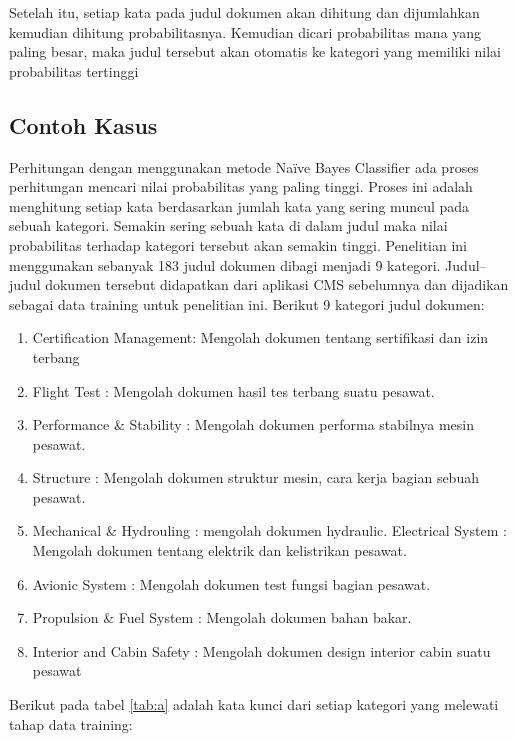 \par Setelah itu, setiap kata pada judul dokumen akan dihitung dan dijumlahkan kemudian dihitung probabilitasnya. Kemudian dicari probabilitas mana yang paling besar, maka judul tersebut akan otomatis ke kategori yang memiliki nilai probabilitas tertinggi

\subsection{Contoh Kasus}
Perhitungan dengan menggunakan metode Naïve Bayes Classifier ada proses perhitungan mencari nilai probabilitas yang paling tinggi. Proses ini adalah menghitung setiap kata berdasarkan jumlah kata yang sering muncul pada sebuah kategori. Semakin sering sebuah kata di dalam judul maka nilai probabilitas terhadap kategori tersebut akan semakin tinggi. Penelitian ini menggunakan sebanyak 183 judul dokumen dibagi menjadi 9 kategori. Judul–judul dokumen tersebut didapatkan dari aplikasi CMS sebelumnya dan dijadikan sebagai data training untuk penelitian ini. Berikut 9 kategori judul dokumen:
    \begin{enumerate}
        \item 	Certification Management: Mengolah dokumen tentang sertifikasi dan izin terbang
    	\item Flight Test : Mengolah dokumen hasil tes terbang suatu pesawat.
	    \item Performance & Stability : Mengolah dokumen performa stabilnya mesin pesawat.
	    \item Structure : Mengolah dokumen struktur mesin, cara kerja bagian sebuah pesawat.
        \item Mechanical & Hydrouling : mengolah dokumen hydraulic.
    	\ITEM Electrical System : Mengolah dokumen tentang elektrik dan kelistrikan pesawat.
	    \item Avionic System : Mengolah dokumen test fungsi bagian pesawat.
	    \item Propulsion & Fuel System : Mengolah dokumen bahan bakar.
	    \item Interior and Cabin Safety : Mengolah dokumen design interior cabin suatu pesawat
    \end{enumerate}
    Berikut pada tabel \ref{tab:a} adalah kata kunci dari setiap kategori yang melewati tahap data training:
    \vspace{5 cm}
